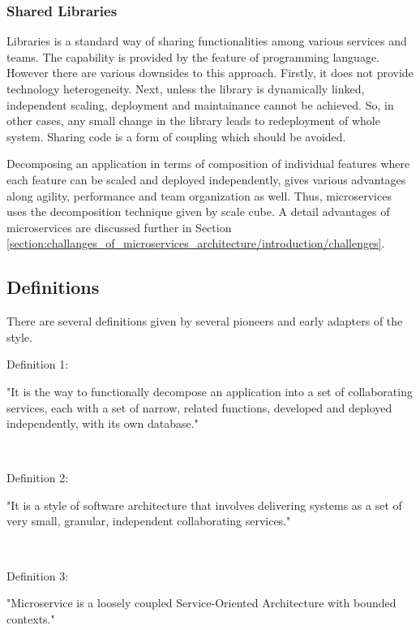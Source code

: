 \subsubsection{Shared Libraries}\label{section:context/microservices_architecture_style/decompostion_of_an_application/shared_libraries}
Libraries is a standard way of sharing functionalities among various services and teams. The capability is provided by the feature of programming language. However there are various downsides to this approach. Firstly, it does not provide technology heterogeneity. Next, unless the library is dynamically linked, independent scaling, deployment and maintainance cannot be achieved. So, in other cases, any small change in the library leads to redeployment of whole system. Sharing code is a form of coupling which should be avoided.

Decomposing an application in terms of composition of individual features where each feature can be scaled and deployed independently, gives various advantages along agility, performance and team organization as well. Thus, microservices uses the decomposition technique given by scale cube. A detail advantages of microservices are discussed further in Section \ref{section:challanges_of_microservices_architecture/introduction/challenges}.
\subsection{Definitions}\label{section:context/microservices_architecture_style/definitions}
There are several definitions given by several pioneers and early adapters of the style.
\\
\begin{shaded}Definition 1: \cite{Richardson:2014ac} \end{shaded}
"It is the way to functionally decompose an application into a set of collaborating services, each with a set of narrow, related functions, developed and deployed independently, with its own database."

\\
\begin{shaded}Definition 2: \cite{Wootton:2014aa}\end{shaded}
"It is a style of software architecture that involves delivering systems as a set of very small, granular, independent collaborating services."


\\
\begin{shaded}Definition 3: \cite{Cockcroft:2015aa}\end{shaded}
"Microservice is a loosely coupled Service-Oriented Architecture with bounded contexts."


